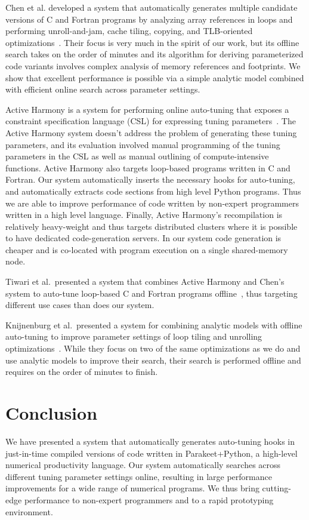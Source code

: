 \documentclass[preprint,9pt]{sigplanconf}
\begin{document}
Chen et al. developed a system that automatically generates multiple candidate versions of C and Fortran programs by analyzing array references in loops and performing unroll-and-jam, cache tiling, copying, and TLB-oriented optimizations~\cite{Chen05b}.  Their focus is very much in the spirit of our work, but its offline search takes on the order of minutes and its algorithm for deriving parameterized code variants involves complex analysis of memory references and footprints.  We show that excellent performance is possible via a simple analytic model combined with efficient online search across parameter settings.

Active Harmony is a system for performing online auto-tuning that exposes a constraint specification language (CSL) for expressing tuning parameters~\cite{Tiwa11}.  The Active Harmony system doesn't address the problem of generating these tuning parameters, and its evaluation involved manual programming of the tuning parameters in the CSL as well as manual outlining of compute-intensive functions.  Active Harmony also targets loop-based programs written in C and Fortran.  Our system automatically inserts the necessary hooks for auto-tuning, and automatically extracts code sections from high level Python programs.  Thus we are able to improve performance of code written by non-expert programmers written in a high level language.  Finally, Active Harmony's recompilation is relatively heavy-weight and thus targets distributed clusters where it is possible to have dedicated code-generation servers.  In our system code generation is cheaper and is co-located with program execution on a single shared-memory node.

Tiwari et al.~presented a system that combines Active Harmony and Chen's system to auto-tune loop-based C and Fortran programs offline~\cite{Tiwa09}, thus targeting different use cases than does our system.

Knijnenburg et al.~presented a system for combining analytic models with offline auto-tuning to improve parameter settings of loop tiling and unrolling optimizations~\cite{Knij04}.  While they focus on two of the same optimizations as we do and use analytic models to improve their search, their search is performed offline and requires on the order of minutes to finish.

\section{Conclusion}
We have presented a system that automatically generates auto-tuning hooks in just-in-time compiled versions of code written in Parakeet+Python, a high-level numerical productivity language.  Our system automatically searches across different tuning parameter settings online, resulting in large performance improvements for a wide range of numerical programs.  We thus bring cutting-edge performance to non-expert programmers and to a rapid prototyping environment.
\end{document}
